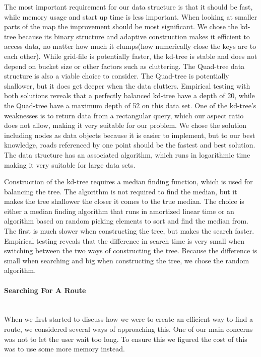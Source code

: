 \documentclass[a4paper,10pt,titlepage]{article}
\begin{document}
The most important requirement for our data structure is that it should be fast, while memory usage and start up time is less important. When looking at smaller parts of the map the improvement should be most significant. We chose the kd-tree because its binary structure and adaptive construction makes it efficient to access data, no matter how much it clumps(how numerically close the keys are to each other). While grid-file is potentially faster, the kd-tree is stable and does not depend on bucket size or other factors such as cluttering.  The Quad-tree data structure is also a viable choice to consider. The Quad-tree is potentially shallower, but it does get deeper when the data clutters. Empirical testing with both solutions reveals that a perfectly balanced kd-tree have a depth of 20, while the Quad-tree have a maximum depth of 52 on this data set. One of the kd-tree’s weaknesses is to return data from a rectangular query, which our aspect ratio does not allow, making it very suitable for our problem. We chose the solution including nodes as data objects because it is easier to implement, but to our best knowledge, roads referenced by one point should be the fastest and best solution. The data structure has an associated algorithm, which runs in logarithmic time making it very suitable for large data sets.

Construction of the kd-tree requires a median finding function, which is used for balancing the tree. The algorithm is not required to find the median, but it makes the tree shallower the closer it comes to the true median. The choice is either a median finding algorithm that runs in amortized linear time or an algorithm based on random picking elements to sort and find the median from. The first is much slower when constructing the tree, but makes the search faster. Empirical testing reveals that the difference in search time is very small when switching between the two ways of constructing the tree. Because the difference is small when searching and big when constructing the tree, we chose the random algorithm.

\paragraph{Searching For A Route}\mbox{}\\
When we first started to discuss how we were to create an efficient way to find a route, we considered several ways of approaching this. One of our main concerns was not to let the user wait too long. To ensure this we figured the cost of this was to use some more memory instead. 
\end{document}
